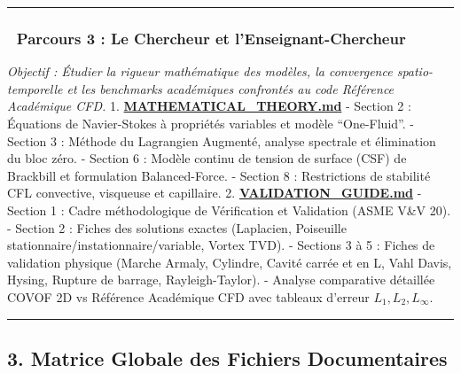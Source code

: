\documentclass[
  french,
]{article}
\begin{document}
\begin{center}\rule{0.5\linewidth}{0.5pt}\end{center}

\subsubsection{🔬 Parcours 3 : Le Chercheur et
l'Enseignant-Chercheur}\label{parcours-3-le-chercheur-et-lenseignant-chercheur}

\emph{Objectif : Étudier la rigueur mathématique des modèles, la
convergence spatio-temporelle et les benchmarks académiques confrontés
au code Référence Académique CFD.} 1.
\textbf{\href{file:///Users/elhadjiibrahimathiam/Documents/PROJET_ANTIGRAVITY/COVOF_2D-FORTRAN/docs/MATHEMATICAL_THEORY.md}{MATHEMATICAL\_THEORY.md}}
- Section 2 : Équations de Navier-Stokes à propriétés variables et
modèle ``One-Fluid''. - Section 3 : Méthode du Lagrangien Augmenté,
analyse spectrale et élimination du bloc zéro. - Section 6 : Modèle
continu de tension de surface (CSF) de Brackbill et formulation
Balanced-Force. - Section 8 : Restrictions de stabilité CFL convective,
visqueuse et capillaire. 2.
\textbf{\href{file:///Users/elhadjiibrahimathiam/Documents/PROJET_ANTIGRAVITY/COVOF_2D-FORTRAN/docs/VALIDATION_GUIDE.md}{VALIDATION\_GUIDE.md}}
- Section 1 : Cadre méthodologique de Vérification et Validation (ASME
V\&V 20). - Section 2 : Fiches des solutions exactes (Laplacien,
Poiseuille stationnaire/instationnaire/variable, Vortex TVD). - Sections
3 à 5 : Fiches de validation physique (Marche Armaly, Cylindre, Cavité
carrée et en L, Vahl Davis, Hysing, Rupture de barrage,
Rayleigh-Taylor). - Analyse comparative détaillée COVOF 2D vs Référence
Académique CFD avec tableaux d'erreur \(L_1, L_2, L_\infty\).

\begin{center}\rule{0.5\linewidth}{0.5pt}\end{center}

\subsection{3. Matrice Globale des Fichiers
Documentaires}\label{matrice-globale-des-fichiers-documentaires}
\end{document}
